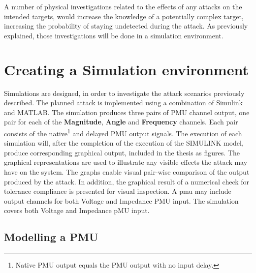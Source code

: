 A number of physical investigations related to the effects of any attacks on the intended targets, would increase the knowledge of a potentially complex target, increasing the probability of staying undetected during the attack. As previously explained, those investigations will be done in a simulation environment.

\section{Creating a Simulation environment}

Simulations are designed, in order to investigate the attack scenarios previously described. The planned attack is implemented using a combination of Simulink and MATLAB. The simulation produces three pairs of PMU channel output, one pair for each of the \textbf{Magnitude}, \textbf{Angle} and \textbf{Frequency} channels.
Each pair consists of the native\footnote{Native PMU output equals the PMU output with no input delay.} and delayed  PMU output signals. 
The execution of each simulation will, after the completion of the execution of the SIMULINK model, produce corresponding graphical output, included in the thesis as figures. The graphical representations are used to illustrate any visible effects the attack may have on the system. The graphs enable visual pair-wise comparison of the output produced by the attack. In addition, the graphical result of a numerical check for tolerance compliance is presented for visual inspection.
A \acrshort{pmu} may include output channels for both Voltage and Impedance PMU input. The simulation covers both Voltage and Impedance pMU input.

\subsection{Modelling a PMU} \label{subsec:ModelPMU}

